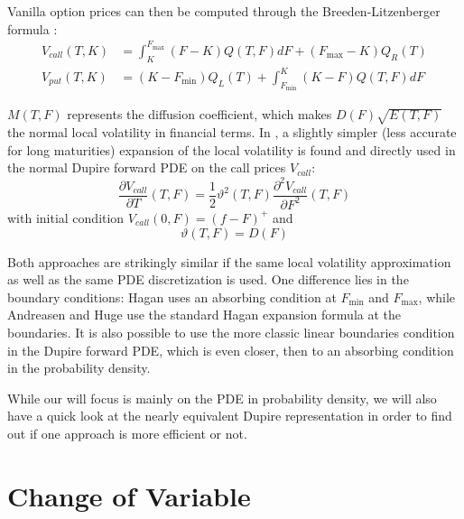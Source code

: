 \documentclass[]{rAMF2e}
\begin{document}
Vanilla option prices can then be computed through the Breeden-Litzenberger formula \citep{breeden1978prices}:
\begin{align}
V_{call} (T, K) &= \int_{K}^{F_{\max}} (F-K) Q(T,F) dF + (F_{\max} - K) Q_R(T) \\
V_{put} (T, K) &= (K-F_{\min}) Q_L(T) + \int_{F_{\min}}^{K} (K-F) Q(T,F) dF 
\end{align}

$M(T,F)$ represents the diffusion coefficient, which makes $D(F)\sqrt{E(T,F)}$ the normal local volatility in financial terms. In \citep{andreasen2011zabr}, a slightly simpler (less accurate for long maturities) expansion of the local volatility is found and directly used in the normal Dupire forward PDE on the call prices $V_{call}$:
\begin{equation}\label{eqn:forward-dupire}
\frac{\partial V_{call}}{\partial T}(T,F) = \frac{1}{2}\vartheta^2(T,F) \frac{\partial^2 V_{call}}{\partial F^2}(T,F)
\end{equation} 
with initial condition $V_{call}(0, F) = (f-F)^{+}$ and
\begin{equation}
\vartheta(T, F) = D(F)
\end{equation}

Both approaches are strikingly similar if the same local volatility approximation as well as the same PDE discretization is used. One difference lies in the boundary conditions: Hagan uses an absorbing condition at $F_{\min}$ and $F_{\max}$, while Andreasen and Huge use the standard Hagan expansion formula at the boundaries. It is also possible to use the more classic linear boundaries condition in the Dupire forward PDE, which is even closer, then to an absorbing condition in the probability density.

While our will focus is mainly on the PDE in probability density, we will also have a quick look at the nearly equivalent Dupire representation in order to find out if one approach is more efficient or not.

\section{Change of Variable}
\end{document}
